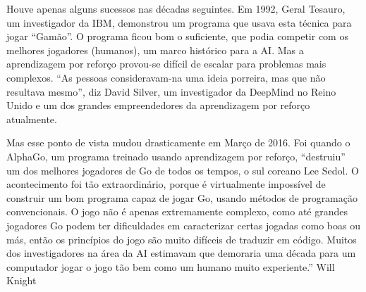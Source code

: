 Houve apenas alguns sucessos nas décadas seguintes. Em 1992, Geral Tesauro, um investigador da IBM, demonstrou um programa que usava esta técnica para jogar “Gamão”. O programa ficou bom o suficiente, que podia competir com os melhores jogadores (humanos), um marco histórico para a AI. Mas a aprendizagem por reforço provou-se difícil de escalar para problemas mais complexos. “As pessoas consideravam-na uma ideia porreira, mas que não resultava mesmo”, diz David Silver, um investigador da DeepMind no Reino Unido e um dos grandes empreendedores da aprendizagem por reforço atualmente.

Mas esse ponto de vista mudou drasticamente em Março de 2016. Foi quando o AlphaGo, um programa treinado usando aprendizagem por reforço, “destruiu” um dos melhores jogadores de Go de todos os tempos, o sul coreano Lee Sedol. O acontecimento foi tão extraordinário, porque é virtualmente impossível de construir um bom programa capaz de jogar Go, usando métodos de programação convencionais. O jogo não é apenas extremamente complexo, como até grandes jogadores Go podem ter dificuldades em caracterizar certas jogadas como boas ou más, então os princípios do jogo são muito difíceis de traduzir em código. Muitos dos investigadores na área da AI estimavam que demoraria uma década para um computador jogar o jogo tão bem como um humano muito experiente.” Will Knight

